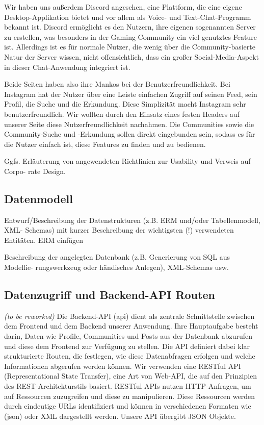 \documentclass[a4paper,12pt]{article}
\begin{document}
Wir haben uns außerdem Discord angesehen, eine Plattform, die eine eigene Desktop-Applikation bietet und vor allem als Voice- und Text-Chat-Programm bekannt ist. Discord ermöglicht es den Nutzern, ihre eigenen sogenannten Server zu erstellen, was besonders in der Gaming-Community ein viel genutztes Feature ist. Allerdings ist es für normale Nutzer, die wenig über die Community-basierte Natur der Server wissen, nicht offensichtlich, dass ein großer Social-Media-Aspekt in dieser Chat-Anwendung integriert ist.

Beide Seiten haben also ihre Mankos bei der Benutzerfreundlichkeit. Bei Instagram hat der Nutzer über eine Leiste einfachen Zugriff auf seinen Feed, sein Profil, die Suche und die Erkundung. Diese Simplizität macht Instagram sehr benutzerfreundlich. Wir wollten durch den Einsatz eines festen Headers auf unserer Seite diese Nutzerfreundlichkeit nachahmen. Die Communities sowie die Community-Suche und -Erkundung sollen direkt eingebunden sein, sodass es für die Nutzer einfach ist, diese Features zu finden und zu bedienen. 

Ggfs. Erläuterung von angewendeten Richtlinien zur Usability und Verweis auf
Corpo- rate Design.

\subsection{Datenmodell}
Entwurf/Beschreibung der Datenstrukturen (z.B. ERM
und/oder Tabellenmodell, XML- Schemas) mit kurzer Beschreibung der wichtigsten
(!) verwendeten Entitäten. ERM einfügen 

Beschreibung der angelegten Datenbank (z.B. Generierung von SQL aus Modellie-
rungswerkzeug oder händisches Anlegen), XML-Schemas usw.

\subsection{Datenzugriff und Backend-API Routen}
\textit{(to be reworked)} 
Die Backend-API (\gls{api}) dient als zentrale Schnittstelle zwischen dem Frontend und dem Backend unserer Anwendung. Ihre Hauptaufgabe besteht darin, Daten wie Profile, Communities und Posts aus der Datenbank abzurufen und diese dem Frontend zur Verfügung zu stellen. Die API definiert dabei klar strukturierte Routen, die festlegen, wie diese Datenabfragen erfolgen und welche Informationen abgerufen werden können. Wir verwenden eine RESTful API (Representational State Transfer), eine Art von Web-API, die auf den Prinzipien des REST-Architekturstils basiert. RESTful APIs nutzen HTTP-Anfragen, um auf Ressourcen zuzugreifen und diese zu manipulieren. Diese Ressourcen werden durch eindeutige URLs identifiziert und können in verschiedenen Formaten wie (\gls{json}) oder XML dargestellt werden. Unsere API übergibt JSON Objekte. 
\end{document}
